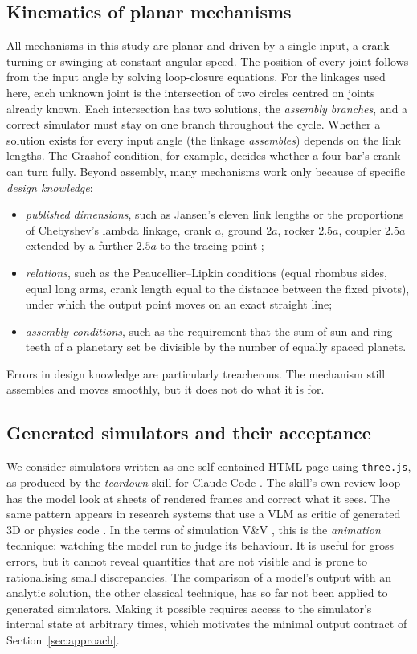 \subsection{Kinematics of planar mechanisms}
All mechanisms in this study are planar and driven by a single input, a crank turning or swinging at constant angular speed. The position of every joint follows from the input angle by solving loop-closure equations. For the linkages used here, each unknown joint is the intersection of two circles centred on joints already known. Each intersection has two solutions, the \emph{assembly branches}, and a correct simulator must stay on one branch throughout the cycle. Whether a solution exists for every input angle (the linkage \emph{assembles}) depends on the link lengths. The Grashof condition, for example, decides whether a four-bar's crank can turn fully. Beyond assembly, many mechanisms work only because of specific \emph{design knowledge}:
\begin{itemize}
\item \emph{published dimensions}, such as Jansen's eleven link lengths \citep{jansen_strandbeest} or the proportions of Chebyshev's lambda linkage, crank $a$, ground $2a$, rocker $2.5a$, coupler $2.5a$ extended by a further $2.5a$ to the tracing point \citep{wiki_lambda};
\item \emph{relations}, such as the Peaucellier--Lipkin conditions (equal rhombus sides, equal long arms, crank length equal to the distance between the fixed pivots), under which the output point moves on an exact straight line;
\item \emph{assembly conditions}, such as the requirement that the sum of sun and ring teeth of a planetary set be divisible by the number of equally spaced planets.
\end{itemize}
Errors in design knowledge are particularly treacherous. The mechanism still assembles and moves smoothly, but it does not do what it is for.

\subsection{Generated simulators and their acceptance}
We consider simulators written as one self-contained HTML page using \texttt{three.js}, as produced by the \emph{teardown} skill for Claude Code \citep{teardown}. The skill's own review loop has the model look at sheets of rendered frames and correct what it sees. The same pattern appears in research systems that use a VLM as critic of generated 3D or physics code \citep{le2025articulate,alrashedy2025cad,shende2026perceptual,gao2026lam}. In the terms of simulation V\&V \citep{sargent2013vv,balci1997vva}, this is the \emph{animation} technique: watching the model run to judge its behaviour. It is useful for gross errors, but it cannot reveal quantities that are not visible and is prone to rationalising small discrepancies. The comparison of a model's output with an analytic solution, the other classical technique, has so far not been applied to generated simulators. Making it possible requires access to the simulator's internal state at arbitrary times, which motivates the minimal output contract of Section~\ref{sec:approach}.
